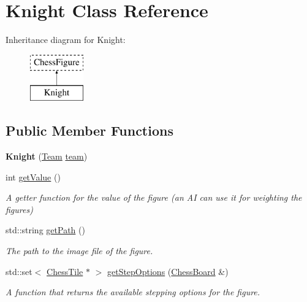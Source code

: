 \hypertarget{classKnight}{}\section{Knight Class Reference}
\label{classKnight}
Inheritance diagram for Knight\+:\begin{figure}[H]
\begin{center}
\leavevmode
\includegraphics[height=2.000000cm]{classKnight}
\end{center}
\end{figure}
\subsection*{Public Member Functions}
\begin{DoxyCompactItemize}
\item 
\mbox{\label{classKnight_aee4103f3beddb7aecb291f578c6a64e1}} 
{\bfseries Knight} (\mbox{\hyperlink{classChessFigure_a62f54318c1f28a08e6a6a2707f697a1d}{Team}} \mbox{\hyperlink{classChessFigure_ac7d0751a28c94d49927b9524390d1261}{team}})
\item 
\mbox{\label{classKnight_af0a9bd91ab46869e921b9cbf7a894e44}} 
int \mbox{\hyperlink{classKnight_af0a9bd91ab46869e921b9cbf7a894e44}{get\+Value}} ()
\begin{DoxyCompactList}\small\item\em A getter function for the value of the figure (an AI can use it for weighting the figures) \end{DoxyCompactList}\item 
\mbox{\label{classKnight_a0df5d1725855c2bf6189258ff8f4e675}} 
std\+::string \mbox{\hyperlink{classKnight_a0df5d1725855c2bf6189258ff8f4e675}{get\+Path}} ()
\begin{DoxyCompactList}\small\item\em The path to the image file of the figure. \end{DoxyCompactList}\item 
std\+::set$<$ \mbox{\hyperlink{classChessTile}{Chess\+Tile}} $\ast$ $>$ \mbox{\hyperlink{classKnight_abb638cd75748653ec35365a77d528c42}{get\+Step\+Options}} (\mbox{\hyperlink{classChessBoard}{Chess\+Board}} \&)
\begin{DoxyCompactList}\small\item\em A function that returns the available stepping options for the figure. \end{DoxyCompactList}\end{DoxyCompactItemize}
